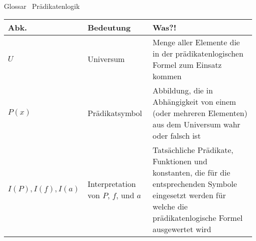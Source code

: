 \begin{frame}[fragile]{Glossar \textemdash\ Prädikatenlogik}
    \small
    \begin{tabular}{p{} p{} p{}}
        \toprule
        Abk.               & Bedeutung                             & Was?!                                                                                                                                                             \\
        \midrule
        $U$                & Universum                             & Menge aller Elemente die in der prädikatenlogischen Formel zum Einsatz kommen                                                                                     \\
        $P(x)$             & Prädikatsymbol                        & Abbildung, die in Abhängigkeit von einem (oder mehreren Elementen) aus dem Universum wahr oder falsch ist                                                         \\
        $I(P), I(f), I(a)$ & Interpretation von  $P$, $f$, und $a$ & Tatsächliche Prädikate, Funktionen und konstanten, die für die entsprechenden Symbole eingesetzt werden für welche die prädikatenlogische Formel ausgewertet wird \\
        \bottomrule
    \end{tabular}
\end{frame}